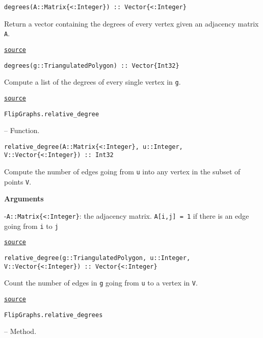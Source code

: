\begin{adjustwidth}{2em}{0pt}


\begin{verbatim}
degrees(A::Matrix{<:Integer}) :: Vector{<:Integer}
\end{verbatim}

Return a vector containing the degrees of every vertex given an adjacency matrix \texttt{A}.



\href{https://github.com/schto223/FlipGraphs.jl/blob/e35d43698a06b86273148826b79d585ba04fcd26/src/generalUtilities.jl#L191-L195}{\texttt{source}}



\begin{verbatim}
degrees(g::TriangulatedPolygon) :: Vector{Int32}
\end{verbatim}

Compute a list of the degrees of every single vertex in \texttt{g}.



\href{https://github.com/schto223/FlipGraphs.jl/blob/e35d43698a06b86273148826b79d585ba04fcd26/src/polygonTriangulations.jl#L222-L226}{\texttt{source}}


\end{adjustwidth}
\hypertarget{16388680941512068090}{\texttt{FlipGraphs.relative\_degree}}  -- {Function.}

\begin{adjustwidth}{2em}{0pt}


\begin{verbatim}
relative_degree(A::Matrix{<:Integer}, u::Integer, V::Vector{<:Integer}) :: Int32
\end{verbatim}

Compute the number of edges going from \texttt{u} into any vertex in the subset of points \texttt{V}.

\textbf{Arguments}

-\texttt{A::Matrix\{<:Integer\}}: the adjacency matrix. \texttt{A[i,j] = 1} if there is an edge going from \texttt{i} to \texttt{j}



\href{https://github.com/schto223/FlipGraphs.jl/blob/e35d43698a06b86273148826b79d585ba04fcd26/src/generalUtilities.jl#L250-L257}{\texttt{source}}



\begin{verbatim}
relative_degree(g::TriangulatedPolygon, u::Integer, V::Vector{<:Integer}) :: Vector{<:Integer}
\end{verbatim}

Count the number of edges in \texttt{g} going from \texttt{u} to a vertex in \texttt{V}.



\href{https://github.com/schto223/FlipGraphs.jl/blob/e35d43698a06b86273148826b79d585ba04fcd26/src/flipGraphPlanar.jl#L395-L399}{\texttt{source}}


\end{adjustwidth}
\hypertarget{17468080694136774284}{\texttt{FlipGraphs.relative\_degrees}}  -- {Method.}

